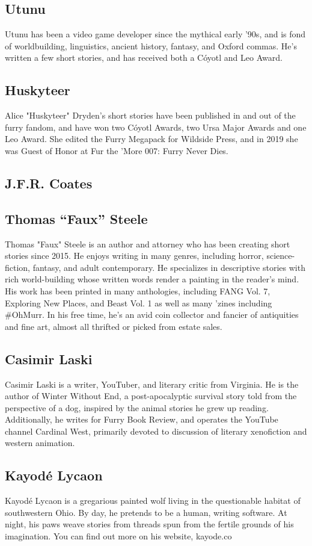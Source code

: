 \subsection*{Utunu}
Utunu has been a video game developer since the mythical early '90s, and is fond of worldbuilding, linguistics, ancient history, fantasy, and Oxford commas. He's written a few short stories, and has received both a Cóyotl and Leo Award.

\subsection*{Huskyteer}
Alice "Huskyteer" Dryden's short stories have been published in and out of the furry fandom, and have won two Cóyotl Awards, two Ursa Major Awards and one Leo Award. She edited the Furry Megapack for Wildside Press, and in 2019 she was Guest of Honor at Fur the 'More 007: Furry Never Dies.

\subsection*{J.F.R. Coates}

\subsection*{Thomas ``Faux'' Steele}
Thomas "Faux" Steele is an author and attorney who has been creating short stories since 2015. He enjoys writing in many genres, including horror, science-fiction, fantasy, and adult contemporary. He specializes in descriptive stories with rich world-building whose written words render a painting in the reader's mind. His work has been printed in many anthologies, including FANG Vol. 7, Exploring New Places, and Beast Vol. 1 as well as many 'zines including \#OhMurr. In his free time, he's an avid coin collector and fancier of antiquities and fine art, almost all thrifted or picked from estate sales.

\subsection*{Casimir Laski}
Casimir Laski is a writer, YouTuber, and literary critic from Virginia. He is the author of Winter Without End, a post-apocalyptic survival story told from the perspective of a dog, inspired by the animal stories he grew up reading. Additionally, he writes for Furry Book Review, and operates the YouTube channel Cardinal West, primarily devoted to discussion of literary xenofiction and western animation.

\subsection*{Kayodé Lycaon}
Kayodé Lycaon is a gregarious painted wolf living in the questionable habitat of southwestern Ohio. By day, he pretends to be a human, writing software. At night, his paws weave stories from threads spun from the fertile grounds of his imagination. You can find out more on his website, kayode.co
